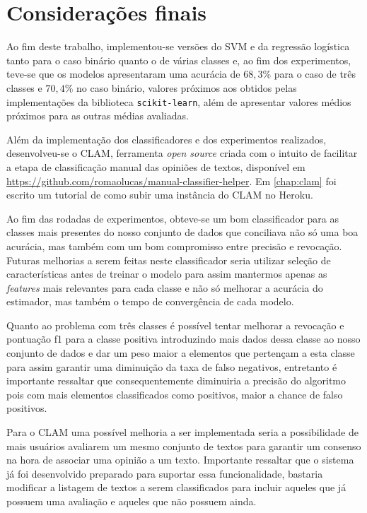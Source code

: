 \chapter{Considerações finais}

Ao fim deste trabalho, implementou-se versões do SVM e da regressão logística
tanto para o caso binário quanto o de várias classes e, ao fim dos experimentos,
teve-se que os modelos apresentaram uma acurácia de $68,3\%$ para o caso
de três classes e $70,4\%$ no caso binário, valores próximos aos
obtidos pelas implementações da biblioteca \texttt{scikit-learn}, além de apresentar
valores médios próximos para as outras médias avaliadas.

Além da implementação dos classificadores e dos experimentos realizados, desenvolveu-se o CLAM,
ferramenta \textit{open source} criada com o intuito de facilitar a etapa de classificação manual
das opiniões de textos, disponível em \url{https://github.com/romaolucas/manual-classifier-helper}.
Em \ref{chap:clam} foi escrito um tutorial de como subir uma instância do CLAM no Heroku.

Ao fim das rodadas de experimentos, obteve-se um bom classificador
para as classes mais presentes do nosso conjunto de dados que conciliava
não só uma boa acurácia, mas também com um bom compromisso entre precisão e
revocação. Futuras melhorias a serem feitas neste classificador seria utilizar
seleção de características antes de treinar o modelo para assim mantermos apenas
as \textit{features} mais relevantes para cada classe e não só melhorar a acurácia
do estimador, mas também o tempo de convergência de cada modelo.

Quanto ao problema com três classes é possível tentar melhorar a revocação e pontuação
f1 para a classe positiva introduzindo mais dados dessa classe ao nosso conjunto de dados
e dar um peso maior a elementos que pertençam a esta classe para assim garantir uma diminuição
da taxa de falso negativos, entretanto é importante ressaltar que consequentemente diminuiria
a precisão do algoritmo pois com mais elementos classificados como positivos, maior a chance
de falso positivos.

Para o CLAM uma possível melhoria a ser implementada seria a possibilidade de mais usuários avaliarem
um mesmo conjunto de textos para garantir um consenso na hora de associar uma opinião a um texto.
Importante ressaltar que o sistema já foi desenvolvido preparado para suportar essa funcionalidade,
bastaria modificar a listagem de textos a serem classificados para incluir aqueles que já possuem
uma avaliação e aqueles que não possuem ainda.

